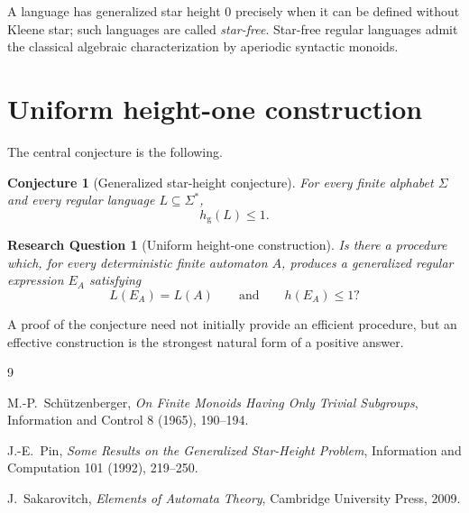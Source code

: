 \documentclass[11pt]{article}
\newtheorem{conjecture}{Conjecture}
\newtheorem{question}{Research Question}
\begin{document}
A language has generalized star height $0$ precisely when it can be defined
without Kleene star; such languages are called \emph{star-free}.  Star-free
regular languages admit the classical algebraic characterization by
aperiodic syntactic monoids.

\section{Uniform height-one construction}



The central conjecture is the following.

\begin{conjecture}[Generalized star-height conjecture]
For every finite alphabet $\Sigma$ and every regular language
$L\subseteq\Sigma^*$,
\[
  h_{\mathrm g}(L)\leq1.
\]
\end{conjecture}

\begin{question}[Uniform height-one construction]
Is there a procedure which, for every deterministic finite automaton $A$,
produces a generalized regular expression $E_A$ satisfying
\[
  L(E_A)=L(A)
  \qquad\text{and}\qquad
  h(E_A)\leq1?
\]
\end{question}

A proof of the conjecture need not initially provide an efficient procedure,
but an effective construction is the strongest natural form of a positive
answer.

\begin{thebibliography}{9}

M.-P.~Sch\"utzenberger,
\emph{On Finite Monoids Having Only Trivial Subgroups},
Information and Control 8 (1965), 190--194.

J.-E.~Pin,
\emph{Some Results on the Generalized Star-Height Problem},
Information and Computation 101 (1992), 219--250.

J.~Sakarovitch,
\emph{Elements of Automata Theory},
Cambridge University Press, 2009.

\end{thebibliography}
\end{document}
